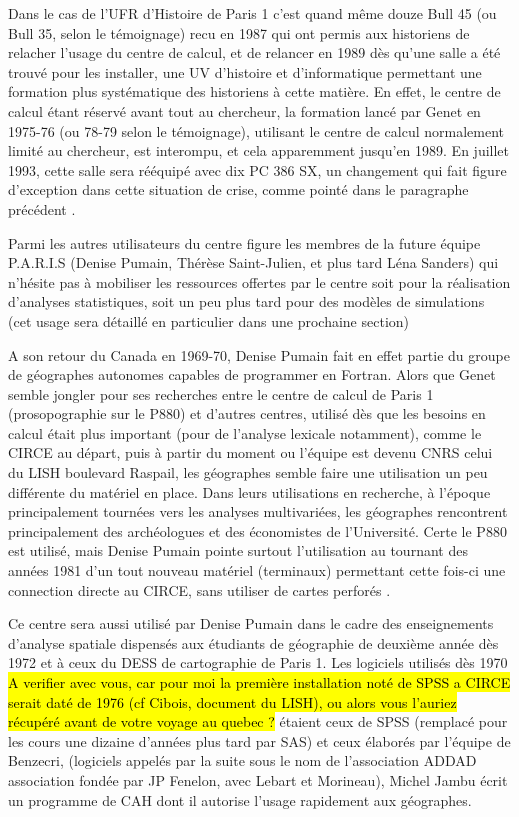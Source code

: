 Dans le cas de l'UFR d'Histoire de Paris 1 c'est quand même douze Bull 45 (ou Bull 35, selon le témoignage) recu en 1987 qui ont permis aux historiens de relacher l'usage du centre de calcul, et de relancer en 1989 dès qu'une salle a été trouvé pour les installer, une UV d'histoire et d'informatique permettant une formation plus systématique des historiens à cette matière. En effet, le centre de calcul étant réservé avant tout au chercheur, la formation lancé par Genet en 1975-76 (ou 78-79 selon le témoignage), utilisant le centre de calcul normalement limité au chercheur, est interompu, et cela apparemment jusqu'en 1989. En juillet 1993, cette salle sera rééquipé avec dix PC 386 SX, un changement qui fait figure d'exception dans cette situation de crise, comme pointé dans le paragraphe précédent \autocite{Genet1993}.

Parmi les autres utilisateurs du centre figure les membres de la future équipe P.A.R.I.S (Denise Pumain, Thérèse Saint-Julien, et plus tard Léna Sanders) qui n'hésite pas à mobiliser les ressources offertes par le centre soit pour la réalisation d'analyses statistiques, soit un peu plus tard pour des modèles de simulations (cet usage sera détaillé en particulier dans une prochaine section)

A son retour du Canada en 1969-70, Denise Pumain fait en effet partie du groupe de géographes autonomes capables de programmer en Fortran. Alors que Genet semble jongler pour ses recherches entre le centre de calcul de Paris 1 (prosopographie sur le P880) et d'autres centres, utilisé dès que les besoins en calcul était plus important (pour de l'analyse lexicale notamment), comme le CIRCE au départ, puis à partir du moment ou l'équipe est devenu CNRS celui du LISH boulevard Raspail, les géographes semble faire une utilisation un peu différente du matériel en place.  Dans leurs utilisations en recherche, à l'époque principalement tournées vers les analyses multivariées, les géographes rencontrent principalement des archéologues et des économistes de l'Université. Certe le P880 est utilisé, mais Denise Pumain pointe surtout l'utilisation au tournant des années 1981 d'un tout nouveau matériel (terminaux) permettant cette fois-ci une connection directe au CIRCE, sans utiliser de cartes perforés .

Ce centre sera aussi utilisé par Denise Pumain dans le cadre des enseignements d'analyse spatiale dispensés aux étudiants de géographie de deuxième année dès 1972 et à ceux du DESS de cartographie de Paris 1. Les logiciels utilisés dès 1970 \hl{A verifier avec vous, car pour moi la première installation noté de SPSS a CIRCE serait daté de 1976 (cf Cibois, document du LISH), ou alors vous l'auriez récupéré avant de votre voyage au quebec ?} étaient ceux de SPSS (remplacé pour les cours une dizaine d'années plus tard par SAS) et ceux élaborés par l'équipe de Benzecri, (logiciels appelés par la suite sous le nom de l'association ADDAD association fondée par JP Fenelon, avec Lebart et Morineau), Michel Jambu écrit un programme de CAH dont il autorise l'usage rapidement aux géographes.

